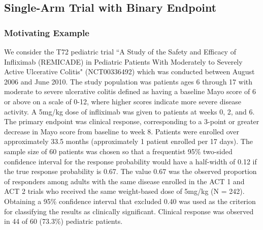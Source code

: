 \documentclass[12pt]{article}
\begin{document}
\subsection{Single-Arm Trial with Binary Endpoint}\label{sec:example1}
\subsubsection{Motivating Example}
We consider the T72 pediatric trial ``A Study of the Safety and Efficacy of Infliximab (REMICADE) in Pediatric Patients With Moderately to Severely Active Ulcerative Colitis" (NCT00336492) \citep{Hyams2012} which was conducted between August 2006 and June 2010.
%
The study population was patients ages 6 through 17 with moderate to severe ulcerative colitis defined as having a baseline Mayo score of 6 or above on a scale of 0-12, where higher scores indicate more severe disease activity.
%
A 5mg/kg dose of infliximab was given to patients at weeks 0, 2, and 6.
%
The primary endpoint was clinical response, corresponding to a 3-point or greater decrease in Mayo score from baseline to week 8. 
%
Patients were enrolled over approximately 33.5 months (approximately 1 patient enrolled per 17 days). 
%
The sample size of 60 patients was chosen so that a frequentist 95\% two-sided confidence interval for the response probability would have a half-width of 0.12 if the true response probability is 0.67.
%
The value 0.67 was the observed proportion of responders among adults with the same disease enrolled in the ACT 1 and ACT 2 trials \citep{Rutgeerts2005} who received the same weight-based dose of 5mg/kg (N = 242).
%
Obtaining a 95\% confidence interval that excluded 0.40 was used as the criterion for classifying the results as clinically significant.
%
Clinical response was observed in 44 of 60 (73.3\%) pediatric patients.
\end{document}
